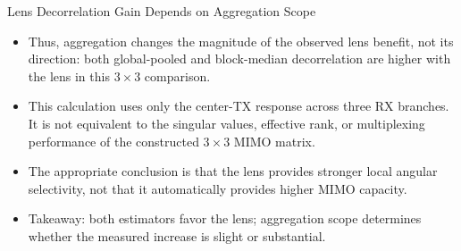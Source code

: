 \begin{frame}[t]{Lens Decorrelation Gain Depends on Aggregation Scope}
{\begin{itemize}
          shows that a typical lens block has more differentiated
          angle-dependent responses.
    \item Thus, aggregation changes the magnitude of the observed lens benefit,
          not its direction: both global-pooled and block-median decorrelation
          are higher with the lens in this $3\times3$ comparison.
    \item This calculation uses only the center-TX response across three RX
          branches. It is not equivalent to the singular values, effective
          rank, or multiplexing performance of the constructed $3\times3$
          MIMO matrix.
    \item The appropriate conclusion is that the lens provides stronger local
          angular selectivity, not that it automatically provides higher MIMO
          capacity.
    \item Takeaway: both estimators favor the lens; aggregation scope determines whether the measured increase is slight or substantial.
  \end{itemize}
}
\end{frame}


